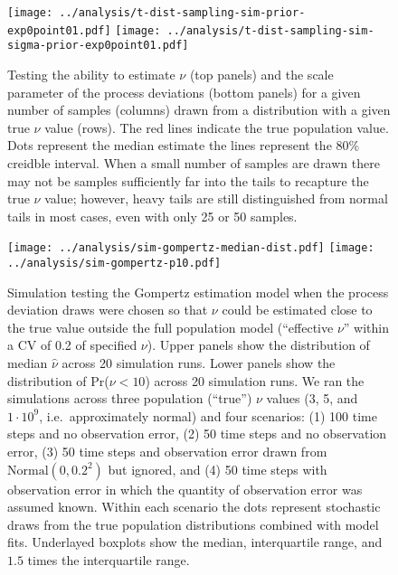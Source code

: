 \begin{figure}[htbp]
\begin{center}
\texttt{[image: ../analysis/t-dist-sampling-sim-prior-exp0point01.pdf]}
\texttt{[image: ../analysis/t-dist-sampling-sim-sigma-prior-exp0point01.pdf]}

\caption[Testing the ability to estimate $\nu$  and the scale parameter of the
process deviations for a given number of samples drawn from a distribution
with a given true $\nu$ value.]{Testing the ability to estimate $\nu$ (top
  panels) and the scale parameter of the process deviations (bottom panels)
  for a given number of samples (columns) drawn from a distribution with a
  given true $\nu$ value (rows). The red lines indicate the true population
  value. Dots represent the median estimate the lines represent the 80\%
  creidble interval. When a small number of samples are drawn there may not be samples
  sufficiently far into the tails to recapture the true $\nu$ value; however,
  heavy tails are still distinguished from normal tails in most cases, even
  with only 25 or 50 samples.}

\label{fig:sim-nu}
\end{center}
\end{figure}

\clearpage

\begin{figure}[htbp]
\begin{center}
\texttt{[image: ../analysis/sim-gompertz-median-dist.pdf]}
\texttt{[image: ../analysis/sim-gompertz-p10.pdf]}

\caption[Simulation testing the Gompertz estimation model when the process
deviation draws were chosen so that $\nu$ could be estimated close to the true
value outside the full population model (``effective $\nu$'' within a CV of
0.2 of specified $\nu$).]{Simulation testing the Gompertz estimation model
  when the process deviation draws were chosen so that $\nu$ could be
  estimated close to the true value outside the full population model
  (``effective $\nu$'' within a CV of 0.2 of specified $\nu$). Upper panels
  show the distribution of median $\widehat{\nu}$ across 20 simulation runs.
  Lower panels show the distribution of Pr($\nu < 10$) across 20 simulation
  runs. We ran the simulations across three population (``true'') $\nu$ values
  (3, 5, and $1\cdot 10^9$, i.e.\ approximately normal) and four scenarios:
  (1) 100 time steps and no observation error, (2) 50 time steps and no
  observation error, (3) 50 time steps and observation error drawn from
  $\mathrm{Normal} (0,
  0.2^2)$ but ignored, and (4) 50 time steps with observation error in which
    the quantity of observation error was assumed known. Within each scenario
    the dots represent stochastic draws from the true population distributions
    combined with model fits. Underlayed boxplots show the median,
    interquartile range, and $1.5$ times the interquartile range. }

\label{fig:sim-prob}
\end{center}
\end{figure}

